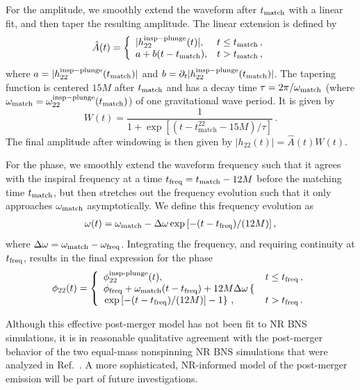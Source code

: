 \documentclass[prd,aps,letter,twocolumn,floatfix,notitlepage,nofootinbib]{revtex4-1}
\begin{document}
For the amplitude, we smoothly extend the waveform after $t_{\rm match}$ with a linear fit, and then taper the resulting amplitude. The linear extension is defined by
\begin{align}
\hat{A}(t)=\left\{\begin{array}{ll}
|h_{22}^{\rm insp-plunge}(t)|, & t \leq t_{\rm match}\,, \\
a + b (t - t_{\rm match}), & t > t_{\rm match}\,,
\end{array}\right.
\end{align}
where $a = |h_{22}^{\rm insp-plunge}(t_{\rm match})|$ and $b=\partial_t |h_{22}^{\rm insp-plunge}(t_{\rm match})|$. The tapering function is centered $15M$ after $t_{\rm match}$ and has a decay time $\tau = 2\pi / \omega_{\rm match}$ (where $\omega_{\rm match} = \omega_{22}^{\rm insp-plunge}(t_{\rm match})$) of one gravitational wave period. It is given by
\begin{equation}
W(t) = \frac{1}{1+\exp{[(t- t^{22}_{\textrm{match}}-15M)/\tau]}}\,.
\end{equation}
The final amplitude after windowing is then given by $|h_{22}(t)| = \hat A(t) W(t)$.

For the phase, we smoothly extend the waveform frequency such that it agrees with the inspiral frequency at a time $t_{\rm freq} = t_{\rm match} - 12M$ before the matching time $t_{\rm match}$, but then stretches out the frequency evolution such that it only approaches $\omega_{\rm match}$ asymptotically. We define this frequency evolution as
\begin{align}
\omega(t) = \omega_{\rm match} - \Delta\omega \exp\left[ -(t - t_{\rm freq}) / (12M) \right],
\end{align}
where $\Delta\omega = \omega_{\rm match} - \omega_{\rm freq}$. Integrating the frequency, and requiring continuity at $t_{\rm freq}$, results in the final expression for the phase
\begin{align}
\phi_{22}(t) = \left\{\begin{array}{ll}
\phi_{22}^{\textrm{insp-plunge}}(t), & t \leq t_{\rm freq} \,, \\
\phi_{\rm freq} + \omega_{\rm match}(t - t_{\rm freq}) + 12M \Delta\omega \left\{ \right. & \\
  \left. \exp\left[ -(t - t_{\rm freq}) / (12M) \right] - 1\right\} \,,& t > t_{\rm freq} \, .
\end{array}\right.
\end{align}

Although this effective post-merger model has not been fit to NR BNS simulations, it is in reasonable qualitative agreement with the post-merger behavior of the two equal-mass nonspinning NR BNS simulations that were analyzed in Ref.~\cite{Hinderer:2016eia}. A more sophisticated, NR-informed model of the post-merger emission will be part of future investigations.
\end{document}
